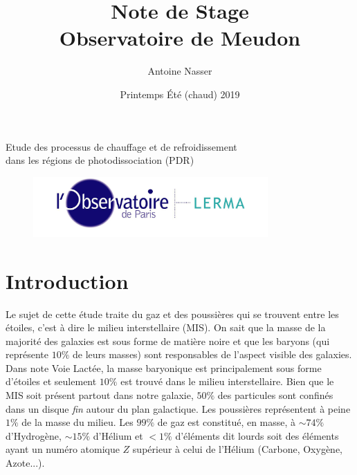 \documentclass[11pt,a4paper]{article}
\title{Note de Stage\\Observatoire de Meudon}
\author{Antoine Nasser}
\date{Printemps Été (chaud) 2019}
\begin{document}
\begin{spacing}{0.98}


\maketitle
\begin{center}{\Large Etude des processus de chauffage et de refroidissement \\ dans les régions de photodissociation (PDR)}\end{center}


\setcounter{secnumdepth}{4}
\vfill
\begin{figure}[!hb]
        \centering 
        \includegraphics[trim = {0 0 0 0cm},clip,width=0.8\textwidth]{figure/LERMA2.jpg}
\end{figure}
\vfill

\tableofcontents

\setcounter{figure}{0}    

\newpage

 
\section*{Introduction}

Le sujet de cette étude traite du gaz et des poussières qui se trouvent entre les étoiles, c'est à dire le milieu interstellaire (MIS). On sait que la masse de la majorité des galaxies est sous forme de matière noire et que les baryons (qui représente $10\%$ de leurs masses) sont responsables de l'aspect visible des galaxies. Dans note Voie Lactée, la masse baryonique est principalement sous forme d'étoiles et seulement $10\%$ est trouvé dans le milieu interstellaire. Bien que le MIS soit présent partout dans notre galaxie, $50\%$ des particules sont confinés dans un disque \textit{fin} autour du plan galactique. Les poussières représentent à peine $1\%$ de la masse du milieu. Les $99\%$ de gaz est constitué, en masse, à $\sim 74\%$ d'Hydrogène, $\sim 15\%$ d'Hélium et $<1\%$ d'éléments dit \og lourds \fg{} soit des éléments ayant un numéro atomique $Z$ supérieur à celui de l'Hélium (Carbone, Oxygène, Azote...).\newline 


\end{spacing}
\end{document}
